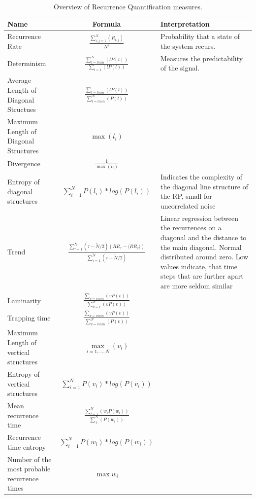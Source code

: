 \documentclass{article}
\begin{document}
\begin{landscape}
\renewcommand{\arraystretch}{2}
\begin{table}[]
\centering
\begin{tabular}{p{4cm}cp{12cm}}
\toprule
 Name & Formula & Interpretation \\
 \midrule
 Recurrence Rate & $\frac{\sum\limits_{i,j=1}^N(R_{i,j})}{N^2} $ & Probability that a state of the system recurs.  \\
 Determinism & $\frac{\sum\limits_{l=lmin}^N(l P(l))}{\sum_{l=1}(l P(l))} $ & Measures the predictability of the signal.   \\
 Average Length \newline of Diagonal Structues & $\frac{\sum_{l=lmin}(l P(l))}{\sum_{l=lmin}^{N}(P(l))}$  &  \\
 Maximum Length \newline of Diagonal Structures & $\max(l_i)$ &  \\
 Divergence & $\frac{1}{\max(l_i)}$ &  \\
 Entropy of diagonal structures & $\sum\limits_{i=1}^N P(l_i) * log(P(l_i))$ & Indicates the complexity of the diagonal line structure of the RP, small for uncorrelated noise  \\
 Trend & $ \frac{\sum_{\tau=1}^{\tilde{N}}(\tau - \tilde{N}/2)(RR_\tau - \langle RR_\tau \rangle)}{\sum_{\tau=1}^{\tilde{N}}(\tau - \tilde{N}/2)}$ &
  Linear regression between the recurrences on a diagonal and the distance to the main diagonal. Normal distributed around zero.
   Low values indicate, that time steps that are further apart are more seldom similar \\
 Laminarity & $\frac{\sum_{v=vmin}(v P(v))}{\sum_{v=1}^{N}(v P(v))}$ &  \\
 Trapping time & $\frac{\sum_{v=vmin}(v P(v))}{\sum_{v=vmin}^{N}(P(v))}$ &  \\
 Maximum Length of vertical structures & $\max\limits_{i=1, ..., N}(v_i)$ &  \\
 Entropy of vertical structures& $\sum\limits_{i=1}^N P(v_i) * log(P(v_i))$ &  \\
 Mean recurrence time & $\frac{\sum\limits_{i=1}^N(w_i P(w_i))}{\sum_{1}^{N}(P(w_i))}$  &  \\
 Recurrence time entropy & $\sum\limits_{i=1}^N P(w_i) * log(P(w_i))$  & \\
 Number of the most probable recurrence times & $\max w_i$ & \\ \bottomrule
\end{tabular}
\caption{Overview of Recurrence Quantification measures.}
\label{RQA_table}
\end{table}
\end{landscape}
\end{document}
